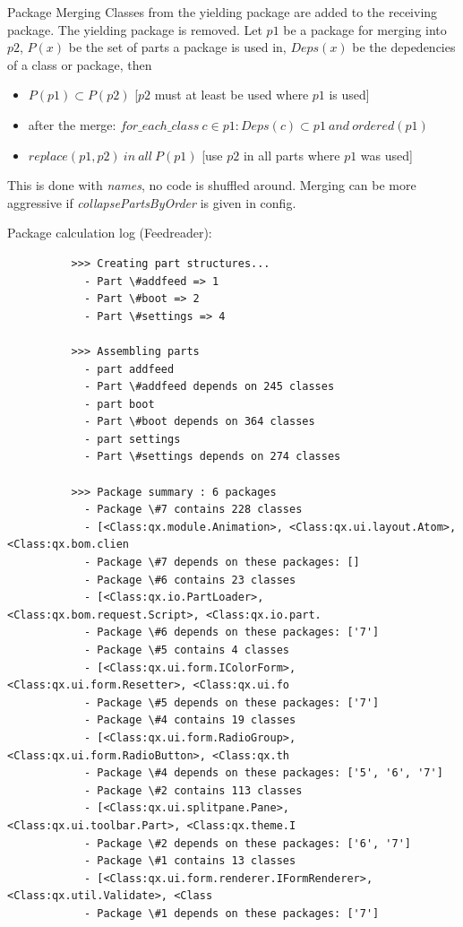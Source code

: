 \documentclass[final]{beamer}
\newlength{\onecolwid}
\begin{document}
\begin{frame}[t]
\begin{columns}[t]
\begin{column}{\onecolwid}
      \begin{block}{Package Merging}
        Classes from the yielding package are added to the receiving package.
        The yielding package is removed. 
        Let $p1$ be a package for merging into $p2$, $P(x)$ be
        the set of parts a package is used in, $Deps(x)$ be the depedencies of
        a class or package, then
        \begin{itemize}
          \item $P(p1) \subset P(p2)$  [$p2$ must at least be used where $p1$ is
            used]
          \item after the merge: $for\_each\_class\ c \in p1: Deps(c) \subset p1\ and\ 
            ordered(p1)$
          \item $replace(p1, p2)\ in\ all\ P(p1)$ [use $p2$ in all parts where $p1$ was
            used]
        \end{itemize}
        This is done with \textit{names}, no code is shuffled around.
        Merging can be more aggressive if \textit{collapsePartsByOrder} is given
        in config.

        Package calculation log (Feedreader):

        \tiny\begin{verbatim}
          >>> Creating part structures...
            - Part \#addfeed => 1
            - Part \#boot => 2
            - Part \#settings => 4

          >>> Assembling parts
            - part addfeed  
            - Part \#addfeed depends on 245 classes
            - part boot  
            - Part \#boot depends on 364 classes
            - part settings  
            - Part \#settings depends on 274 classes

          >>> Package summary : 6 packages
            - Package \#7 contains 228 classes
            - [<Class:qx.module.Animation>, <Class:qx.ui.layout.Atom>, <Class:qx.bom.clien
            - Package \#7 depends on these packages: []
            - Package \#6 contains 23 classes
            - [<Class:qx.io.PartLoader>, <Class:qx.bom.request.Script>, <Class:qx.io.part.
            - Package \#6 depends on these packages: ['7']
            - Package \#5 contains 4 classes
            - [<Class:qx.ui.form.IColorForm>, <Class:qx.ui.form.Resetter>, <Class:qx.ui.fo
            - Package \#5 depends on these packages: ['7']
            - Package \#4 contains 19 classes
            - [<Class:qx.ui.form.RadioGroup>, <Class:qx.ui.form.RadioButton>, <Class:qx.th
            - Package \#4 depends on these packages: ['5', '6', '7']
            - Package \#2 contains 113 classes
            - [<Class:qx.ui.splitpane.Pane>, <Class:qx.ui.toolbar.Part>, <Class:qx.theme.I
            - Package \#2 depends on these packages: ['6', '7']
            - Package \#1 contains 13 classes
            - [<Class:qx.ui.form.renderer.IFormRenderer>, <Class:qx.util.Validate>, <Class
            - Package \#1 depends on these packages: ['7']


\end{verbatim}
\end{block}
\end{column}
\end{columns}
\end{frame}
\end{document}

